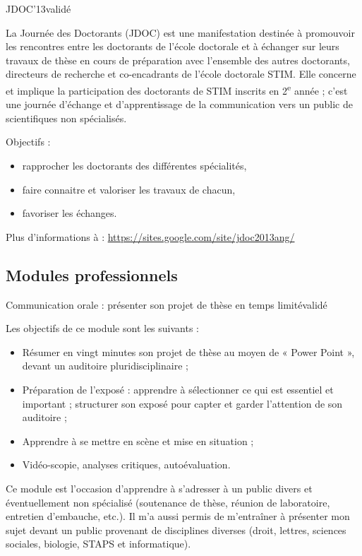 \formation
{JDOC'13}{validé}
{La Journée des Doctorants (JDOC) est une manifestation destinée à promouvoir les rencontres entre les doctorants de l'école doctorale et à échanger sur leurs travaux de thèse en cours de préparation avec l'ensemble des autres doctorants, directeurs de recherche et co-encadrants de l'école doctorale STIM. Elle concerne et implique la participation des doctorants de STIM inscrits en 2\textsuperscript{e} année ; c'est une journée d'échange et d'apprentissage de la communication vers un public de scientifiques non spécialisés.

Objectifs :
\begin{itemize}
  \item rapprocher les doctorants des différentes spécialités,
  \item faire connaitre et valoriser les travaux de chacun,
  \item favoriser les échanges.
\end{itemize}

Plus d'informations à : \url{https://sites.google.com/site/jdoc2013ang/}}



\subsection{Modules professionnels}

\formation
{Communication orale : présenter son projet de thèse en temps limité}{validé}
{Les objectifs de ce module sont les suivants :
\begin{itemize}
  \item Résumer en vingt minutes son projet de thèse au moyen de « Power Point », devant un auditoire pluridisciplinaire ;
  \item Préparation de l'exposé : apprendre à sélectionner ce qui est essentiel et important ; structurer son exposé pour capter et garder l'attention de son auditoire ;
  \item Apprendre à se mettre en scène et mise en situation ;
  \item Vidéo-scopie, analyses critiques, autoévaluation.
\end{itemize}

Ce module est l'occasion d'apprendre à s'adresser à un public divers et éventuellement non spécialisé (soutenance de thèse, réunion de laboratoire, entretien d'embauche, etc.).
Il m'a aussi permis de m'entraîner à présenter mon sujet devant un public provenant de disciplines diverses (droit, lettres, sciences sociales, biologie, STAPS et informatique).}

